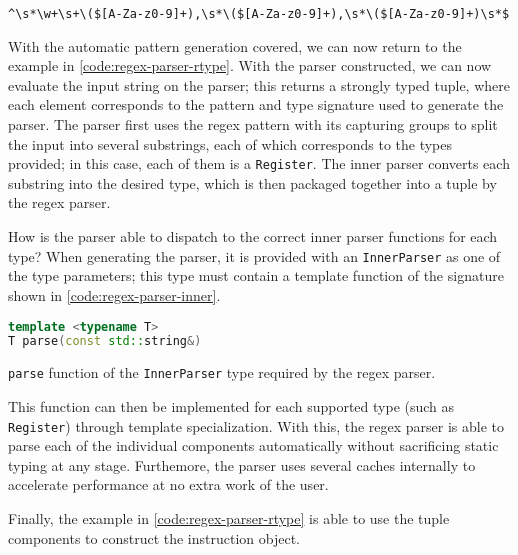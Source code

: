 \texttt{\^{}\textbackslash s*\textbackslash w+\textbackslash s+\textbackslash (\$[A-Za-z0-9]+),\textbackslash s*\textbackslash (\$[A-Za-z0-9]+),\textbackslash s*\textbackslash (\$[A-Za-z0-9]+)\textbackslash s*\$}

With the automatic pattern generation covered, we can now return to the example in \autoref{code:regex-parser-rtype}. With the parser constructed, we can now evaluate the input string on the parser; this returns a strongly typed tuple, where each element corresponds to the pattern and type signature used to generate the parser. The parser first uses the regex pattern with its capturing groups to split the input into several substrings, each of which corresponds to the types provided; in this case, each of them is a \texttt{Register}. The inner parser converts each substring into the desired type, which is then packaged together into a tuple by the regex parser.

How is the parser able to dispatch to the correct inner parser functions for each type? When generating the parser, it is provided with an \texttt{InnerParser} as one of the type parameters; this type must contain a template function of the signature shown in \autoref{code:regex-parser-inner}.

\begin{lstfloat}[H]
    \begin{lstlisting}[language=c++]
template <typename T>
T parse(const std::string&)
    \end{lstlisting}
    \caption{\texttt{parse} function of the \texttt{InnerParser} type required by the regex parser.}
    \label{code:regex-parser-inner}
\end{lstfloat}

This function can then be implemented for each supported type (such as \texttt{Register}) through template specialization. With this, the regex parser is able to parse each of the individual components automatically without sacrificing static typing at any stage. Furthemore, the parser uses several caches internally to accelerate performance at no extra work of the user.

Finally, the example in \autoref{code:regex-parser-rtype} is able to use the tuple components to construct the instruction object.